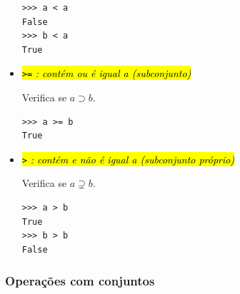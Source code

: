 \begin{itemize}
\begin{lstlisting}
>>> a < a
False
>>> b < a
True
\end{lstlisting}

\item \hl{{\lstinline+>=+} \emph{: contém ou é igual a (subconjunto)}}

    Verifica se $a\supset b$.

\begin{lstlisting}
>>> a >= b
True
\end{lstlisting}

\item \hl{{\lstinline+>+} \emph{: contém e não é igual a (subconjunto próprio)}}

  Verifica se $a\supsetneq b$.
  
\begin{lstlisting}
>>> a > b
True
>>> b > b
False
\end{lstlisting}
\end{itemize}

\subsubsection{Operações com conjuntos}

